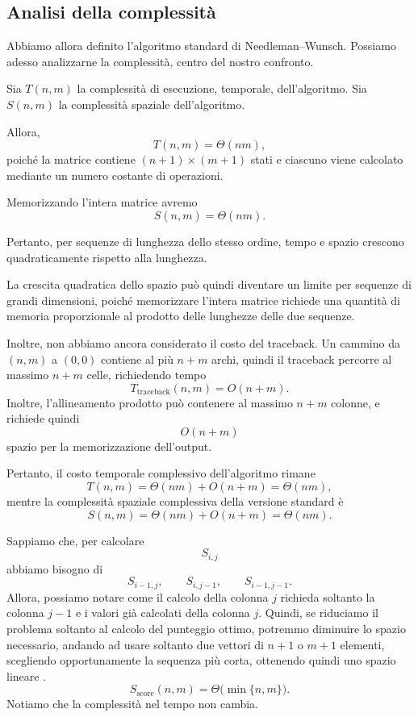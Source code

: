 \subsection{Analisi della complessità}
\label{sec:NW-complessità}

Abbiamo allora definito l'algoritmo standard di Needleman--Wunsch.
Possiamo adesso analizzarne la complessità, centro del nostro confronto.

Sia $T(n,m)$ la complessità di esecuzione, temporale, dell'algoritmo.
Sia $S(n,m)$ la complessità spaziale dell'algoritmo.

Allora,
\[
    T(n,m) = \Theta(nm),
\]
poiché la matrice contiene $(n+1) \times(m+1)$ stati e ciascuno viene calcolato mediante un numero costante di operazioni.

Memorizzando l'intera matrice avremo
\[
    S(n,m) = \Theta(nm).
\]

Pertanto, per sequenze di lunghezza dello stesso ordine, tempo e spazio crescono quadraticamente rispetto alla lunghezza.

La crescita quadratica dello spazio può quindi diventare un limite per sequenze di grandi dimensioni, poiché memorizzare l'intera matrice richiede
una quantità di memoria proporzionale al prodotto delle lunghezze delle due sequenze.

Inoltre, non abbiamo ancora considerato il costo del traceback.
Un cammino da $(n,m)$ a $(0,0)$ contiene al più $n+m$ archi, quindi il traceback percorre al massimo $n+m$ celle, richiedendo tempo
\[
    T_{\text{traceback}}(n,m) = O(n+m).
\]
Inoltre, l'allineamento prodotto può contenere al massimo $n+m$ colonne, e richiede quindi
\[
    O(n+m)
\]
spazio per la memorizzazione dell'output.

Pertanto, il costo temporale complessivo dell'algoritmo rimane
\[
    T(n,m) = \Theta(nm) + O(n+m) = \Theta(nm),
\]
mentre la complessità spaziale complessiva della versione standard è
\[
    S(n,m) = \Theta(nm) + O(n+m) = \Theta(nm).
\]

Sappiamo che, per calcolare
\[
    S_{i,j}
\]
abbiamo bisogno di
\[
    S_{i-1,j}, \qquad S_{i,j-1}, \qquad S_{i-1,j-1}.
\]
Allora, possiamo notare come il calcolo della colonna $j$ richieda soltanto la colonna $j-1$ e i valori già calcolati della colonna $j$.
Quindi, se riduciamo il problema soltanto al calcolo del punteggio ottimo, potremmo diminuire lo spazio necessario, andando ad usare soltanto
due vettori di $n+1$ o $m+1$ elementi, scegliendo opportunamente la sequenza più corta, ottenendo quindi uno spazio lineare
\cite[pp.~230--231]{jones--pevzner}.
\[
    S_{\text{score}}(n,m) = \Theta\bigl(\min \{ n,m \}\bigr).
\]
Notiamo che la complessità nel tempo non cambia.

